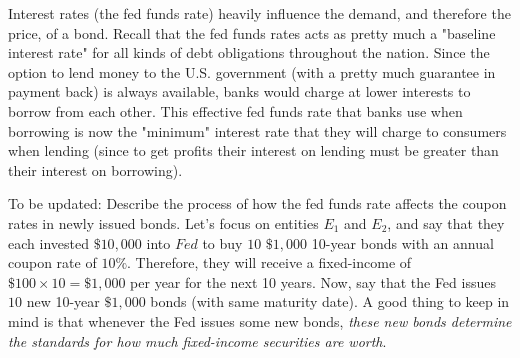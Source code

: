 \documentclass{article}
\begin{document}
    Interest rates (the fed funds rate) heavily influence the demand, and therefore the price, of a bond. Recall that the fed funds rates acts as pretty much a "baseline interest rate" for all kinds of debt obligations throughout the nation. Since the option to lend money to the U.S. government (with a pretty much guarantee in payment back) is always available, banks would charge at lower interests to borrow from each other. This effective fed funds rate that banks use when borrowing is now the "minimum" interest rate that they will charge to consumers when lending (since to get profits their interest on lending must be greater than their interest on borrowing).

    To be updated: Describe the process of how the fed funds rate affects the coupon rates in newly issued bonds.
    Let's focus on entities $E_1$ and $E_2$, and say that they each invested $\$10,000$ into $Fed$ to buy $10$ $\$1,000$ 10-year bonds with an annual coupon rate of $10\%$. Therefore, they will receive a fixed-income of $\$100 \times 10 = \$1,000$ per year for the next 10 years. Now, say that the Fed issues $10$ new 10-year $\$1,000$ bonds (with same maturity date). A good thing to keep in mind is that whenever the Fed issues some new bonds, \textit{these new bonds determine the standards for how much fixed-income securities are worth}.
\end{document}
